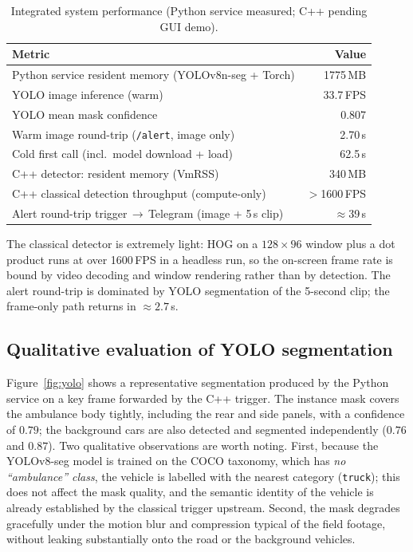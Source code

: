 \documentclass[12pt, a4paper]{article}
\begin{document}
\begin{table}[htbp]
\centering
\caption{Integrated system performance (Python service measured; C++ pending GUI demo).}
\label{tab:sysperf}
\begin{tabular}{l r}
\toprule
\textbf{Metric} & \textbf{Value} \\
\midrule
Python service resident memory (YOLOv8n-seg + Torch) & 1775\,MB \\
YOLO image inference (warm)                          & 33.7\,FPS \\
YOLO mean mask confidence                            & 0.807 \\
Warm image round-trip (\texttt{/alert}, image only)  & 2.70\,s \\
Cold first call (incl.\ model download + load)       & 62.5\,s \\
\midrule
C++ detector: resident memory (VmRSS)                & 340\,MB \\
C++ classical detection throughput (compute-only)    & $>$1600\,FPS \\
Alert round-trip trigger\,$\to$\,Telegram (image + 5\,s clip) & $\approx$39\,s \\
\bottomrule
\end{tabular}
\end{table}

\noindent The classical detector is extremely light: HOG on a $128\times96$ window plus a
dot product runs at over 1600\,FPS in a headless run, so the on-screen frame rate is bound
by video decoding and window rendering rather than by detection. The alert round-trip is
dominated by YOLO segmentation of the 5-second clip; the frame-only path returns in
$\approx 2.7$\,s.

\subsection{Qualitative evaluation of YOLO segmentation}
Figure~\ref{fig:yolo} shows a representative segmentation produced by the Python service on
a key frame forwarded by the C++ trigger. The instance mask covers the ambulance body
tightly, including the rear and side panels, with a confidence of $0.79$; the background
cars are also detected and segmented independently ($0.76$ and $0.87$). Two qualitative
observations are worth noting. First, because the YOLOv8-seg model is trained on the COCO
taxonomy, which has \emph{no ``ambulance'' class}, the vehicle is labelled with the nearest
category (\texttt{truck}); this does not affect the mask quality, and the semantic identity
of the vehicle is already established by the classical trigger upstream. Second, the mask
degrades gracefully under the motion blur and compression typical of the field footage,
without leaking substantially onto the road or the background vehicles.
\end{document}
